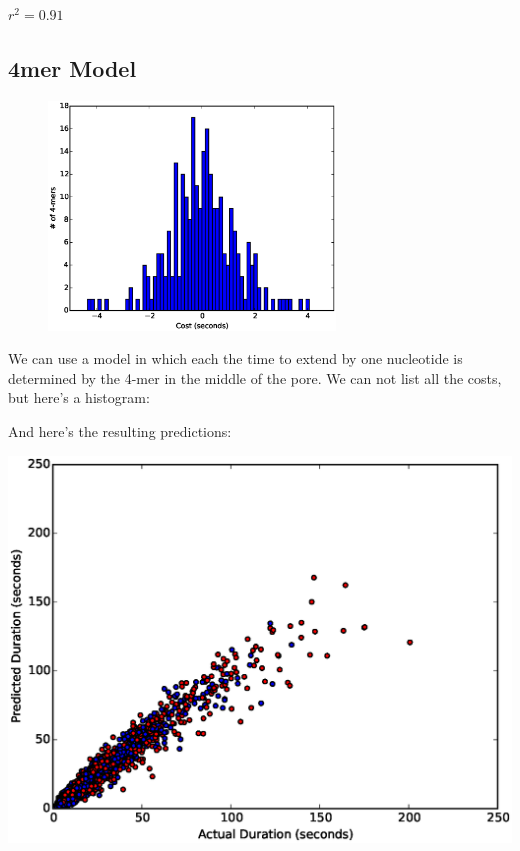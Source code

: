 \documentclass[11pt]{article}
\begin{document}
$r^2=0.91$


        \newpage
        \subsection*{4mer Model}
        \begin{figure}
        \vspace{-50pt}
        \includegraphics[width=3in]{part11hist4}
        \vspace{-70pt}
        \end{figure}
        We can use a model in which each the time to extend by one nucleotide is determined by the 4-mer in the middle of the
        pore.  We can not list all the costs, but here's a histogram:

        \vspace{1.5in}

        And here's the resulting predictions:
        
\includegraphics[width=\textwidth]{part11scatter4mer}
\end{document}
